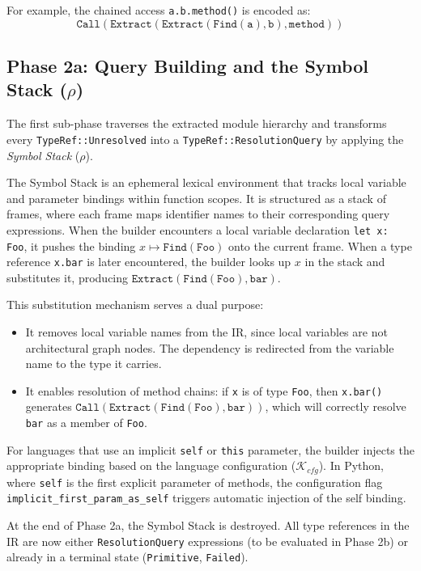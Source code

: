 For example, the chained access \texttt{a.b.method()} is encoded as:
$$\texttt{Call}(\texttt{Extract}(\texttt{Extract}(\texttt{Find}(\texttt{a}), \texttt{b}), \texttt{method}))$$

\subsection{Phase 2a: Query Building and the Symbol Stack ($\rho$)}
\label{sec:query_building}

The first sub-phase traverses the extracted module hierarchy and transforms every \texttt{TypeRef::Unresolved} into a \texttt{TypeRef::ResolutionQuery} by applying the \textit{Symbol Stack} ($\rho$).

The Symbol Stack is an ephemeral lexical environment that tracks local variable and parameter bindings within function scopes. It is structured as a stack of frames, where each frame maps identifier names to their corresponding query expressions. When the builder encounters a local variable declaration \texttt{let x: Foo}, it pushes the binding $x \mapsto \texttt{Find}(\texttt{Foo})$ onto the current frame. When a type reference \texttt{x.bar} is later encountered, the builder looks up $x$ in the stack and substitutes it, producing $\texttt{Extract}(\texttt{Find}(\texttt{Foo}), \texttt{bar})$.

This substitution mechanism serves a dual purpose:
\begin{itemize}
  \item It removes local variable names from the IR, since local variables are not architectural graph nodes. The dependency is redirected from the variable name to the type it carries.
  \item It enables resolution of method chains: if \texttt{x} is of type \texttt{Foo}, then \texttt{x.bar()} generates $\texttt{Call}(\texttt{Extract}(\texttt{Find}(\texttt{Foo}), \texttt{bar}))$, which will correctly resolve \texttt{bar} as a member of \texttt{Foo}.
\end{itemize}

For languages that use an implicit \texttt{self} or \texttt{this} parameter, the builder injects the appropriate binding based on the language configuration ($\mathcal{K}_{cfg}$). In Python, where \texttt{self} is the first explicit parameter of methods, the configuration flag \texttt{implicit\_first\_param\_as\_self} triggers automatic injection of the self binding.

At the end of Phase 2a, the Symbol Stack is destroyed. All type references in the IR are now either \texttt{ResolutionQuery} expressions (to be evaluated in Phase 2b) or already in a terminal state (\texttt{Primitive}, \texttt{Failed}).

